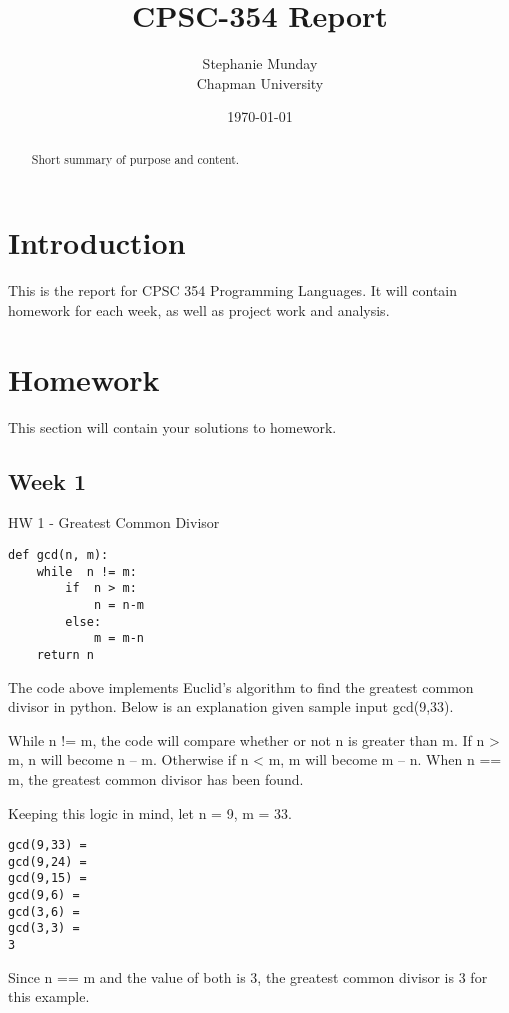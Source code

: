 \documentclass{article}
\title{CPSC-354 Report}
\author{Stephanie Munday  \\ Chapman University}
\date{\today}
\theoremstyle{theorem}
\theoremstyle{definition}
\theoremstyle{remark}
\begin{document}
\maketitle

\begin{abstract}
Short  summary of purpose and content.  
\end{abstract}

\tableofcontents

\section{Introduction}\label{intro}

This is the report for CPSC 354 Programming Languages. It will contain homework for each week, as well as project work and analysis.


\section{Homework}\label{homework}

This section will contain your solutions to homework. 

\subsection{Week 1}

HW 1 - Greatest Common Divisor

\begin{lstlisting}
def gcd(n, m):
    while  n != m:
        if  n > m:
            n = n-m
        else:
            m = m-n
    return n 
\end{lstlisting}
%
The code above implements Euclid's algorithm to find the greatest common divisor in python. Below is an explanation given sample input gcd(9,33).

\medskip\noindent
While n != m, the code will compare whether or not n is greater than m. If n \textgreater{} m, n will become n -- m. Otherwise if n \textless{} m, m will become m -- n. When n == m, the greatest common divisor has been found.

\medskip\noindent
Keeping this logic in mind, let n = 9, m = 33.

\begin{lstlisting}
gcd(9,33) =
gcd(9,24) =
gcd(9,15) =
gcd(9,6) =
gcd(3,6) =
gcd(3,3) =
3
\end{lstlisting}
%

\medskip\noindent
Since n == m and the value of both is 3, the greatest common divisor is 3 for this example.
\end{document}
